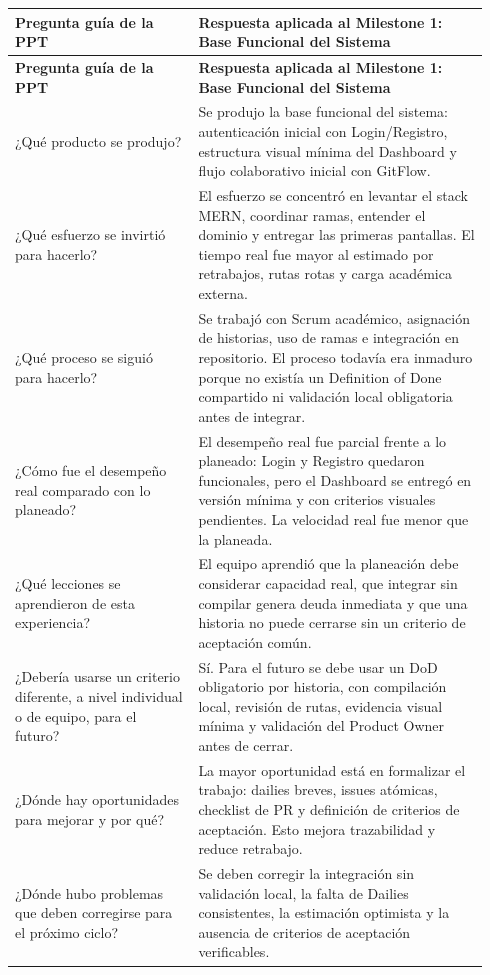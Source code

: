 \documentclass[11pt,a4paper]{article}
\begin{document}
\begingroup
\small
\setlength{\tabcolsep}{3pt}
\begin{longtable}{P{0.36\linewidth}P{0.58\linewidth}}
\toprule
\textbf{Pregunta guía de la PPT} & \textbf{Respuesta aplicada al Milestone 1: Base Funcional del Sistema} \\
\midrule
\endfirsthead
\toprule
\textbf{Pregunta guía de la PPT} & \textbf{Respuesta aplicada al Milestone 1: Base Funcional del Sistema} \\
\midrule
\endhead
\bottomrule
\endlastfoot
¿Qué producto se produjo? & Se produjo la base funcional del sistema: autenticación inicial con Login/Registro, estructura visual mínima del Dashboard y flujo colaborativo inicial con GitFlow. \\
¿Qué esfuerzo se invirtió para hacerlo? & El esfuerzo se concentró en levantar el stack MERN, coordinar ramas, entender el dominio y entregar las primeras pantallas. El tiempo real fue mayor al estimado por retrabajos, rutas rotas y carga académica externa. \\
¿Qué proceso se siguió para hacerlo? & Se trabajó con Scrum académico, asignación de historias, uso de ramas e integración en repositorio. El proceso todavía era inmaduro porque no existía un Definition of Done compartido ni validación local obligatoria antes de integrar. \\
¿Cómo fue el desempeño real comparado con lo planeado? & El desempeño real fue parcial frente a lo planeado: Login y Registro quedaron funcionales, pero el Dashboard se entregó en versión mínima y con criterios visuales pendientes. La velocidad real fue menor que la planeada. \\
¿Qué lecciones se aprendieron de esta experiencia? & El equipo aprendió que la planeación debe considerar capacidad real, que integrar sin compilar genera deuda inmediata y que una historia no puede cerrarse sin un criterio de aceptación común. \\
¿Debería usarse un criterio diferente, a nivel individual o de equipo, para el futuro? & Sí. Para el futuro se debe usar un DoD obligatorio por historia, con compilación local, revisión de rutas, evidencia visual mínima y validación del Product Owner antes de cerrar. \\
¿Dónde hay oportunidades para mejorar y por qué? & La mayor oportunidad está en formalizar el trabajo: dailies breves, issues atómicas, checklist de PR y definición de criterios de aceptación. Esto mejora trazabilidad y reduce retrabajo. \\
¿Dónde hubo problemas que deben corregirse para el próximo ciclo? & Se deben corregir la integración sin validación local, la falta de Dailies consistentes, la estimación optimista y la ausencia de criterios de aceptación verificables. \\

\end{longtable}
\end{document}
